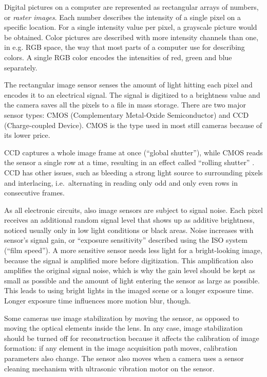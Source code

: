 
Digital pictures on a computer are represented as rectangular arrays of numbers, or \emph{raster images}.
Each number describes the intensity of a single pixel on a specific location.
For a single intensity value per pixel, a grayscale picture would be obtained.
Color pictures are described with more intensity channels than one, in e.g. RGB space, the way that most parts of a computer use for describing colors.
A single RGB color encodes the intensities of red, green and blue separately.


The rectangular image sensor senses the amount of light hitting each pixel and encodes it to an electrical signal.
The signal is digitized to a brightness value and the camera saves all the pixels to a file in mass storage.
There are two major sensor types: CMOS (Complementary Metal-Oxide Semiconductor) and CCD (Charge-coupled Device).
CMOS is the type used in most still cameras because of its lower price.

CCD captures a whole image frame at once (``global shutter''), while CMOS reads the sensor a single row at a time, resulting in an effect called ``rolling shutter'' \cite{todo:cmos}.
CCD has other issues, such as bleeding a strong light source to surrounding pixels and interlacing, i.e.~alternating in reading only odd and only even rows in consecutive frames.


As all electronic circuits, also image sensors are subject to signal noise.
Each pixel receives an additional random signal level that shows up as additive brightness, noticed usually only in low light conditions or black areas.
Noise increases with sensor's signal gain, or ``exposure sensitivity'' described using the ISO system (``film speed'').
A more sensitive sensor needs less light for a bright-looking image, because the signal is amplified more before digitization.
This amplification also amplifies the original signal noise, which is why the gain level should be kept as small as possible and the amount of light entering the sensor as large as possible.
This leads to using bright lights in the imaged scene or a longer exposure time.
Longer exposure time influences more motion blur, though.


Some cameras use image stabilization by moving the sensor, as opposed to moving the optical elements inside the lens.
In any case, image stabilization should be turned off for reconstruction because it affects the calibration of image formation: if any element in the image acquisition path moves, calibration parameters also change.
The sensor also moves when a camera uses a sensor cleaning mechanism with ultrasonic vibration motor on the sensor.

